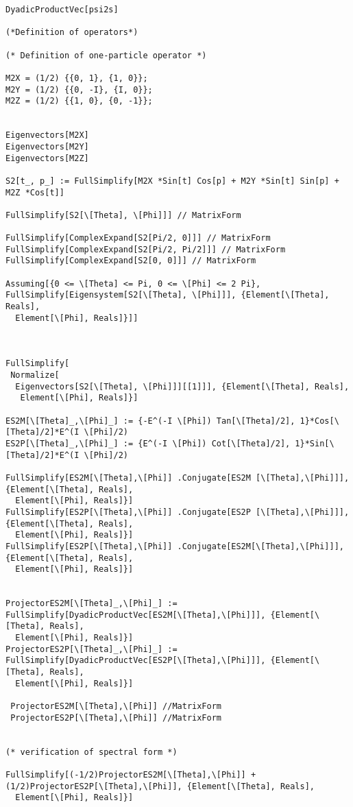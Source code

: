 \documentclass[%
 showpacs,
 showkeys,
 preprintnumbers,
 amsmath,amssymb,
 aps,
  pra,
  longbibliography,
 floatfix,
 ]{revtex4-1}
\begin{document}
{\begin{lstlisting}[backgroundcolor=\color{yellow!10},framerule=0pt,breaklines=true, frame=tb]
DyadicProductVec[psi2s]

(*Definition of operators*)

(* Definition of one-particle operator *)

M2X = (1/2) {{0, 1}, {1, 0}};
M2Y = (1/2) {{0, -I}, {I, 0}};
M2Z = (1/2) {{1, 0}, {0, -1}};


Eigenvectors[M2X]
Eigenvectors[M2Y]
Eigenvectors[M2Z]

S2[t_, p_] := FullSimplify[M2X *Sin[t] Cos[p] + M2Y *Sin[t] Sin[p] + M2Z *Cos[t]]

FullSimplify[S2[\[Theta], \[Phi]]] // MatrixForm

FullSimplify[ComplexExpand[S2[Pi/2, 0]]] // MatrixForm
FullSimplify[ComplexExpand[S2[Pi/2, Pi/2]]] // MatrixForm
FullSimplify[ComplexExpand[S2[0, 0]]] // MatrixForm

Assuming[{0 <= \[Theta] <= Pi, 0 <= \[Phi] <= 2 Pi}, FullSimplify[Eigensystem[S2[\[Theta], \[Phi]]], {Element[\[Theta], Reals],
  Element[\[Phi], Reals]}]]



FullSimplify[
 Normalize[
  Eigenvectors[S2[\[Theta], \[Phi]]][[1]]], {Element[\[Theta], Reals],
   Element[\[Phi], Reals]}]

ES2M[\[Theta]_,\[Phi]_] := {-E^(-I \[Phi]) Tan[\[Theta]/2], 1}*Cos[\[Theta]/2]*E^(I \[Phi]/2)
ES2P[\[Theta]_,\[Phi]_] := {E^(-I \[Phi]) Cot[\[Theta]/2], 1}*Sin[\[Theta]/2]*E^(I \[Phi]/2)

FullSimplify[ES2M[\[Theta],\[Phi]] .Conjugate[ES2M [\[Theta],\[Phi]]], {Element[\[Theta], Reals],
  Element[\[Phi], Reals]}]
FullSimplify[ES2P[\[Theta],\[Phi]] .Conjugate[ES2P [\[Theta],\[Phi]]], {Element[\[Theta], Reals],
  Element[\[Phi], Reals]}]
FullSimplify[ES2P[\[Theta],\[Phi]] .Conjugate[ES2M[\[Theta],\[Phi]]], {Element[\[Theta], Reals],
  Element[\[Phi], Reals]}]


ProjectorES2M[\[Theta]_,\[Phi]_] := FullSimplify[DyadicProductVec[ES2M[\[Theta],\[Phi]]], {Element[\[Theta], Reals],
  Element[\[Phi], Reals]}]
ProjectorES2P[\[Theta]_,\[Phi]_] := FullSimplify[DyadicProductVec[ES2P[\[Theta],\[Phi]]], {Element[\[Theta], Reals],
  Element[\[Phi], Reals]}]

 ProjectorES2M[\[Theta],\[Phi]] //MatrixForm
 ProjectorES2P[\[Theta],\[Phi]] //MatrixForm


(* verification of spectral form *)

FullSimplify[(-1/2)ProjectorES2M[\[Theta],\[Phi]] + (1/2)ProjectorES2P[\[Theta],\[Phi]], {Element[\[Theta], Reals],
  Element[\[Phi], Reals]}]



\end{lstlisting}}
\end{document}
